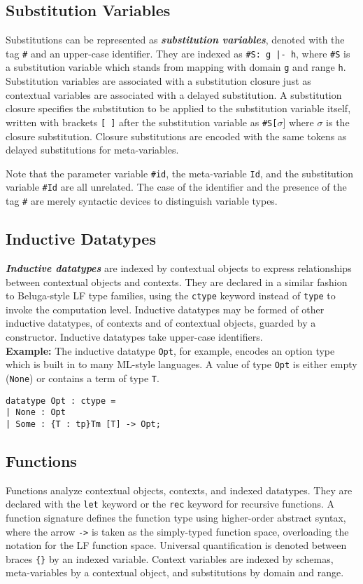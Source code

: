 \documentclass[11pt]{article}
\begin{document}
\subsection{Substitution Variables}
Substitutions can be represented as \textit{\textbf{substitution variables}}, denoted with the tag \texttt{\#} and an upper-case identifier. They are indexed as \texttt{\#S: g |- h}, where \texttt{\#S} is a substitution variable which stands from mapping with domain \texttt{g} and range \texttt{h}. Substitution variables are associated with a substitution closure just as contextual variables are associated with a delayed substitution. A substitution closure specifies the substitution to be applied to the substitution variable itself, written with brackets \texttt{[ ]} after the substitution variable as \texttt{\#S[}$\sigma${]} where $\sigma$ is the closure substitution. Closure substitutions are encoded with the same tokens as delayed substitutions for meta-variables. 

Note that the parameter variable \texttt{\#id}, the meta-variable \texttt{Id}, and the substitution variable \texttt{\#Id} are all unrelated. The case of the identifier and the presence of the tag \texttt{\#} are merely syntactic devices to distinguish variable types.

\subsection{Inductive Datatypes}
\textbf{\textit{Inductive datatypes}} are indexed by contextual objects to express relationships between contextual objects and contexts. They are declared in a similar fashion to Beluga-style LF type families, using the \texttt{ctype} keyword instead of \texttt{type} to invoke the computation level. Inductive datatypes may be formed of other inductive datatypes, of contexts and of contextual objects, guarded by a constructor. Inductive datatypes take upper-case identifiers. \\

\textbf{Example:} The inductive datatype \texttt{Opt}, for example, encodes an option type which is built in to many ML-style languages. A value of type \texttt{Opt} is either empty (\texttt{None}) or contains a term of type \texttt{T}.
\begin{verbatim}
datatype Opt : ctype =
| None : Opt
| Some : {T : tp}Tm [T] -> Opt;
\end{verbatim}

\subsection{Functions}
Functions analyze contextual objects, contexts, and indexed datatypes. They are declared with the \texttt{let} keyword or the \texttt{rec} keyword for recursive functions. A function signature defines the function type using higher-order abstract syntax, where the arrow \texttt{->} is taken as the simply-typed function space, overloading the notation for the LF function space. Universal quantification is denoted between braces \texttt{\{\}} by an indexed variable. Context variables are indexed by schemas, meta-variables by a contextual object, and substitutions by domain and range.
\end{document}
